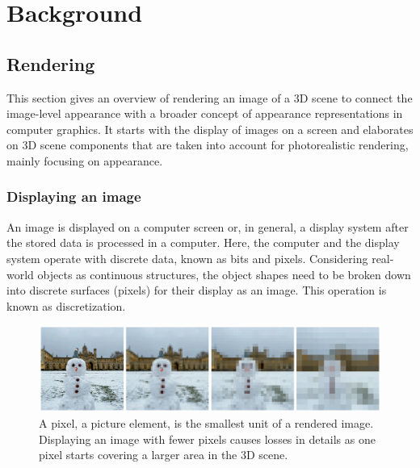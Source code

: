 \chapter{Background}

\section{Rendering}

This section gives an overview of rendering an image of a 3D scene to connect the image-level appearance with a broader concept of appearance representations in computer graphics.  It starts with the display of images on a screen and elaborates on 3D scene components that are taken into account for photorealistic rendering, mainly focusing on appearance. 

\subsection{Displaying an image}
An image is displayed on a computer screen or, in general, a display system after the stored data is processed in a computer. Here, the computer and the display system operate with discrete data, known as bits and pixels. Considering real-world objects as continuous structures, the object shapes need to be broken down into discrete surfaces (pixels) for their display as an image. This operation is known as discretization. 

\begin{figure}[h]
  \centering

    \includegraphics[width=\linewidth]{Images/pixelate_image_snowman.png}

   \caption{A pixel, a picture element, is the smallest unit of a rendered image. Displaying an image with fewer pixels causes losses in details as one pixel starts covering a larger area in the 3D scene.}
   \label{fig:colour-approximate}
\end{figure}

